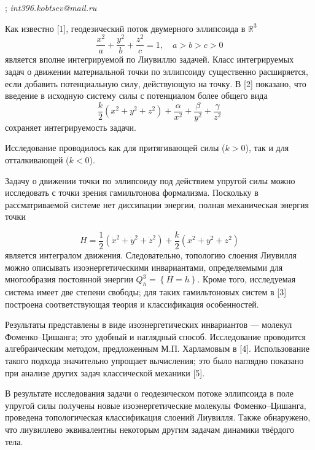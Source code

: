 

; {\it int396.kobtsev@mail.ru}

\vzmscaption


Как известно [1], геодезический поток двумерного эллипсоида в $\mathbb{R}^3$
%
%
$$
\frac{x^2}{a}+\frac{y^2}{b}+\frac{z^2}{c}=1,\quad a>b>c>0
$$
является вполне интегрируемой по Лиувиллю задачей. Класс интегрируемых задач о движении материальной точки по эллипсоиду существенно расширяется, если добавить потенциальную силу, действующую на точку. В [2] показано, что введение в исходную систему силы с потенциалом более общего вида
$$
\frac{k}{2}\left( x^2+y^2+z^2\right)+\frac{\alpha}{x^2}+\frac{\beta}{y^2}+\frac{\gamma}{z^2}
$$
сохраняет интегрируемость задачи.

Исследование проводилось как для притягивающей силы
\linebreak
($k>0$), так и для отталкивающей ($k<0$).


Задачу о движении точки по эллипсоиду под действием упругой силы можно исследовать с точки зрения гамильтонова формализма. Поскольку в рассматриваемой системе нет диссипации энергии, полная механическая энергия точки

$$
H=\frac{1}{2}\left(\dot x^2+\dot y^2+\dot z^2\right)+\frac{k}{2}\left(x^2+y^2+z^2\right)
$$
является интегралом движения. Следовательно, топологию слоения Лиувилля можно описывать изоэнергетическими инвариантами, определяемыми для многообразия постоянной энергии $Q^3_h=\left\{H=h \right\}$. Кроме того, исследуемая система имеет две степени свободы; для таких гамильтоновых систем в [3] построена соответствующая теория и  классификация особенностей.


Результаты представлены в виде изоэнергетических инвариантов --- молекул Фоменко--Цишанга;
это удобный и наглядный способ.
Исследование проводится алгебраическим методом,
\linebreak
предложенным М.П. Харламовым в [4].
Использование такого подхода значительно упрощает вычисления;
это было наглядно показано при анализе других задач классической механики [5].

В результате исследования задачи о геодезическом потоке эллипсоида в поле упругой силы получены новые изоэнергетические молекулы Фоменко--Цишанга, проведена топологическая классификация слоений Лиувилля. Также обнаружено, что лиувиллево эквивалентны некоторым другим задачам динамики твёрдого тела.


